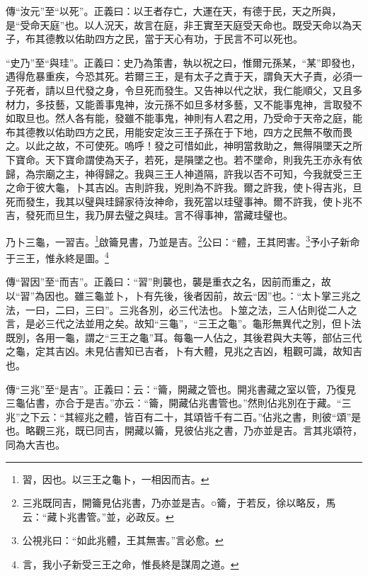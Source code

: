 {\noindent\zhuan{}\fzbyks 傳“汝元”至“以死”。正義曰：以王者存亡，大運在天，有德于民，天之所與，是“受命天庭”也。以人況天，故言在庭，非王實至天庭受天命也。既受天命以為天子，布其德教以佑助四方之民，當于天心有功，于民言不可以死也。 \par}

{\noindent\shu{}\fzkt “史乃”至“與珪”。正義曰：史乃為策書，執以祝之曰，惟爾元孫某，“某”即發也，遇得危暴重疾，今恐其死。若爾三王，是有太子之責于天，謂負天大子責，必須一子死者，請以旦代發之身，令旦死而發生。又告神以代之狀，我仁能順父，又且多材力，多技藝，又能善事鬼神，汝元孫不如旦多材多藝，又不能事鬼神，言取發不如取旦也。然人各有能，發雖不能事鬼，神則有人君之用，乃受命于天帝之庭，能布其德教以佑助四方之民，用能安定汝三王子孫在于下地，四方之民無不敬而畏之。以此之故，不可使死。嗚呼！發之可惜如此，神明當救助之，無得隕墜天之所下寶命。天下寶命謂使為天子，若死，是隕墜之也。若不墜命，則我先王亦永有依歸，為宗廟之主，神得歸之。我與三王人神道隔，許我以否不可知，今我就受三王之命于彼大龜，卜其吉凶。吉則許我，兇則為不許我。爾之許我，使卜得吉兆，旦死而發生，我其以璧與珪歸家待汝神命，我死當以珪璧事神。爾不許我，使卜兆不吉，發死而旦生，我乃屏去璧之與珪。言不得事神，當藏珪璧也。 \par}

乃卜三龜，一習吉。\footnote{習，因也。以三王之龜卜，一相因而吉。}啟籥見書，乃並是吉。\footnote{三兆既同吉，開籥見佔兆書，乃亦並是吉。○籥，于若反，徐以略反，馬云：“藏卜兆書管。”並，必政反。}公曰：“體，王其罔害。\footnote{公視兆曰：“如此兆體，王其無害。”言必愈。}予小子新命于三王，惟永終是圖。\footnote{言，我小子新受三王之命，惟長終是謀周之道。}


{\noindent\zhuan{}\fzbyks 傳“習因”至“而吉”。正義曰：“習”則襲也，襲是重衣之名，因前而重之，故以“習”為因也。雖三龜並卜，卜有先後，後者因前，故云“因”也。：“太卜掌三兆之法，一曰，二曰，三曰”。三兆各別，必三代法也。卜筮之法，三人佔則從二人之言，是必三代之法並用之矣。故知“三龜”，“三王之龜”。龜形無異代之別，但卜法既別，各用一龜，謂之“三王之龜”耳。每龜一人佔之，其後君與大夫等，部佔三代之龜，定其吉凶。未見佔書知已吉者，卜有大體，見兆之吉凶，粗觀可識，故知吉也。 \par}

{\noindent\zhuan{}\fzbyks 傳“三兆”至“是吉”。正義曰：云：“籥，開藏之管也。開兆書藏之室以管，乃復見三龜佔書，亦合于是吉。”亦云：“籥，開藏佔兆書管也。”然則佔兆別在于藏。“三兆”之下云：“其經兆之體，皆百有二十，其頌皆千有二百。”佔兆之書，則彼“頌”是也。略觀三兆，既已同吉，開藏以籥，見彼佔兆之書，乃亦並是吉。言其兆頌符，同為大吉也。 \par}

